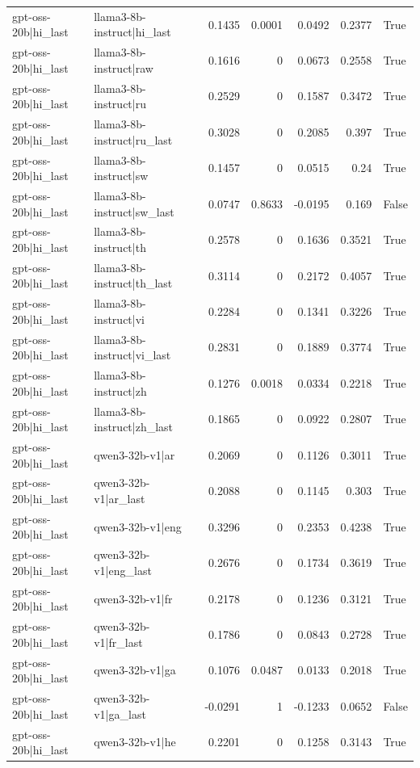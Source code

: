 \begin{table}
\begin{tabular}{l l r r r r l}
gpt-oss-20b|hi_last & llama3-8b-instruct|hi_last & 0.1435 & 0.0001 & 0.0492 & 0.2377 & True \\
gpt-oss-20b|hi_last & llama3-8b-instruct|raw & 0.1616 & 0 & 0.0673 & 0.2558 & True \\
gpt-oss-20b|hi_last & llama3-8b-instruct|ru & 0.2529 & 0 & 0.1587 & 0.3472 & True \\
gpt-oss-20b|hi_last & llama3-8b-instruct|ru_last & 0.3028 & 0 & 0.2085 & 0.397 & True \\
gpt-oss-20b|hi_last & llama3-8b-instruct|sw & 0.1457 & 0 & 0.0515 & 0.24 & True \\
gpt-oss-20b|hi_last & llama3-8b-instruct|sw_last & 0.0747 & 0.8633 & -0.0195 & 0.169 & False \\
gpt-oss-20b|hi_last & llama3-8b-instruct|th & 0.2578 & 0 & 0.1636 & 0.3521 & True \\
gpt-oss-20b|hi_last & llama3-8b-instruct|th_last & 0.3114 & 0 & 0.2172 & 0.4057 & True \\
gpt-oss-20b|hi_last & llama3-8b-instruct|vi & 0.2284 & 0 & 0.1341 & 0.3226 & True \\
gpt-oss-20b|hi_last & llama3-8b-instruct|vi_last & 0.2831 & 0 & 0.1889 & 0.3774 & True \\
gpt-oss-20b|hi_last & llama3-8b-instruct|zh & 0.1276 & 0.0018 & 0.0334 & 0.2218 & True \\
gpt-oss-20b|hi_last & llama3-8b-instruct|zh_last & 0.1865 & 0 & 0.0922 & 0.2807 & True \\
gpt-oss-20b|hi_last & qwen3-32b-v1|ar & 0.2069 & 0 & 0.1126 & 0.3011 & True \\
gpt-oss-20b|hi_last & qwen3-32b-v1|ar_last & 0.2088 & 0 & 0.1145 & 0.303 & True \\
gpt-oss-20b|hi_last & qwen3-32b-v1|eng & 0.3296 & 0 & 0.2353 & 0.4238 & True \\
gpt-oss-20b|hi_last & qwen3-32b-v1|eng_last & 0.2676 & 0 & 0.1734 & 0.3619 & True \\
gpt-oss-20b|hi_last & qwen3-32b-v1|fr & 0.2178 & 0 & 0.1236 & 0.3121 & True \\
gpt-oss-20b|hi_last & qwen3-32b-v1|fr_last & 0.1786 & 0 & 0.0843 & 0.2728 & True \\
gpt-oss-20b|hi_last & qwen3-32b-v1|ga & 0.1076 & 0.0487 & 0.0133 & 0.2018 & True \\
gpt-oss-20b|hi_last & qwen3-32b-v1|ga_last & -0.0291 & 1 & -0.1233 & 0.0652 & False \\
gpt-oss-20b|hi_last & qwen3-32b-v1|he & 0.2201 & 0 & 0.1258 & 0.3143 & True \\

\end{tabular}
\end{table}
